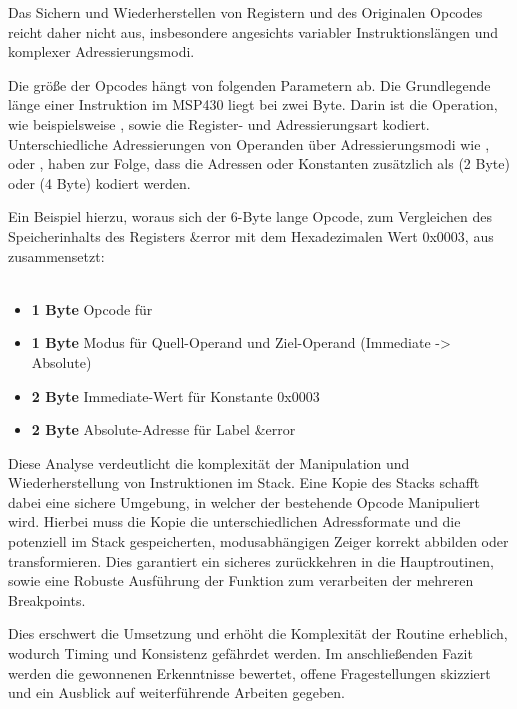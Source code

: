 Das Sichern und Wiederherstellen von Registern und des Originalen Opcodes reicht daher nicht aus, insbesondere angesichts variabler Instruktionsl\"angen und komplexer Adressierungsmodi. 

Die gr\"o{\ss}e der Opcodes h\"angt von folgenden Parametern ab. Die Grundlegende l\"ange einer Instruktion im MSP430 liegt bei zwei Byte. Darin ist die Operation, wie beispielsweise , sowie die Register- und Adressierungsart kodiert. Unterschiedliche Adressierungen von Operanden \"uber Adressierungsmodi wie \glqq{}\grqq{}, \glqq{}\grqq{} oder \glqq{}\grqq{}, haben zur Folge, dass die Adressen oder Konstanten zus\"atzlich als  (2 Byte) oder  (4 Byte) kodiert werden.\\

Ein Beispiel hierzu, woraus sich der 6-Byte lange Opcode, zum Vergleichen des Speicherinhalts des Registers \glqq{}\&error\grqq{} mit dem Hexadezimalen Wert \glqq{}0x0003\grqq{}, aus  zusammensetzt: \\
\\\textbf{} 
\begin{itemize}
	\item \textbf{1 Byte} Opcode f\"ur 
	\item \textbf{1 Byte} Modus f\"ur Quell-Operand und Ziel-Operand (Immediate -> Absolute)
	\item \textbf{2 Byte} Immediate-Wert f\"ur Konstante \glqq{}0x0003\grqq{}
	\item \textbf{2 Byte} Absolute-Adresse f\"ur Label \glqq{}\&error\grqq{}
\end{itemize}

\newpage
Diese Analyse verdeutlicht die komplexit\"at der Manipulation und Wiederherstellung von Instruktionen im Stack. Eine Kopie des Stacks schafft dabei eine sichere Umgebung, in welcher der bestehende Opcode Manipuliert wird. Hierbei muss die Kopie die unterschiedlichen Adressformate und die potenziell im Stack gespeicherten, modusabh\"angigen Zeiger korrekt abbilden oder transformieren. Dies garantiert ein sicheres zur\"uckkehren in die Hauptroutinen, sowie eine Robuste Ausf\"uhrung der Funktion zum verarbeiten der \ggf mehreren Breakpoints.

Dies erschwert die Umsetzung und erh\"oht die Komplexit\"at der Routine erheblich, wodurch Timing und Konsistenz gef\"ahrdet werden. Im anschlie{\ss}enden Fazit werden die gewonnenen Erkenntnisse bewertet, offene Fragestellungen skizziert und ein Ausblick auf weiterf\"uhrende Arbeiten gegeben.

